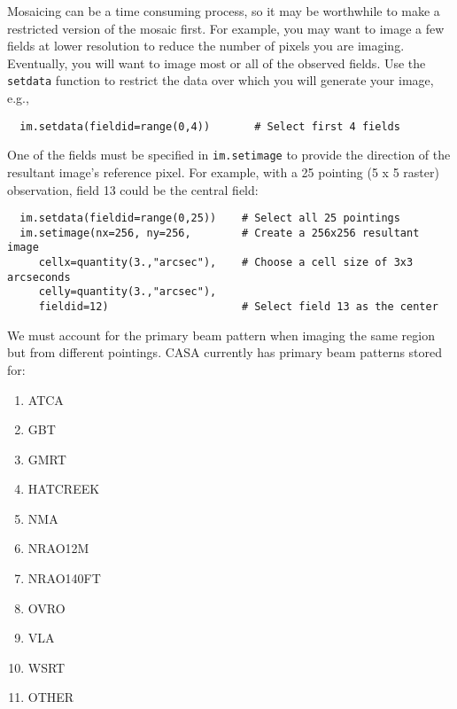 \vspace{3mm}

Mosaicing can be a time consuming process, so it may be worthwhile to make
a restricted version of the mosaic first.  For example, you may want to
image a few fields at lower resolution to reduce the number of
pixels you are imaging.  Eventually, you will want to image most or all
of the observed fields. Use the {\tt setdata} function to restrict the
data over which you will generate your image, e.g.,

\small
\begin{verbatim}
  im.setdata(fieldid=range(0,4))       # Select first 4 fields
\end{verbatim}
\normalsize

\vspace{3mm}

One of the fields must be specified in {\tt im.setimage} to provide
the direction of the resultant image's reference pixel.  For example,
with a 25 pointing (5 x 5 raster) observation, field 13 could be the
central field:

\small
\begin{verbatim}
  im.setdata(fieldid=range(0,25))    # Select all 25 pointings
  im.setimage(nx=256, ny=256,        # Create a 256x256 resultant image
     cellx=quantity(3.,"arcsec"),    # Choose a cell size of 3x3 arcseconds
     celly=quantity(3.,"arcsec"),
     fieldid=12)                     # Select field 13 as the center
\end{verbatim}
\normalsize

\vspace{3mm}


We must account for the primary beam pattern when imaging the same
region but from different pointings. CASA currently has primary beam patterns stored for:

\begin{enumerate}
   \item ATCA
   \item GBT
   \item GMRT
   \item HATCREEK
   \item NMA
   \item NRAO12M
   \item NRAO140FT
   \item OVRO
   \item VLA
   \item WSRT
   \item OTHER
\end{enumerate}

